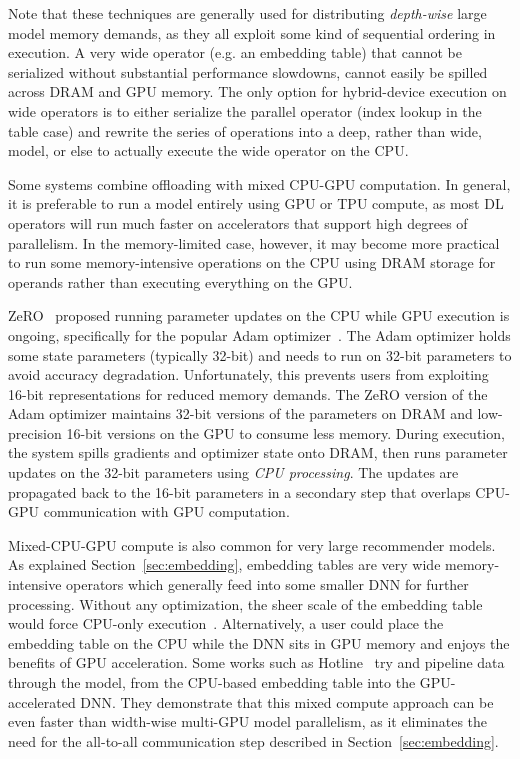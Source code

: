 Note that these techniques are generally used for distributing \textit{depth-wise} large model memory demands, as they all exploit some kind of sequential ordering in execution. A very wide operator (e.g. an embedding table) that cannot be serialized without substantial performance slowdowns, cannot easily be spilled across DRAM and GPU memory. The only option for hybrid-device execution on wide operators is to either serialize the parallel operator (index lookup in the table case) and rewrite the series of operations into a deep, rather than wide, model, or else to actually execute the wide operator on the CPU. 

Some systems combine offloading with mixed CPU-GPU computation. In general, it is preferable to run a model entirely using GPU or TPU compute, as most DL operators will run much faster on accelerators that support high degrees of parallelism. In the memory-limited case, however, it may become more practical to run some memory-intensive operations on the CPU using DRAM storage for operands rather than executing everything on the GPU.

ZeRO~\cite{zerooffload2021} proposed running parameter updates on the CPU while GPU execution is ongoing, specifically for the popular Adam optimizer~\cite{adam2014}. The Adam optimizer holds some state parameters (typically 32-bit) and needs to run on 32-bit parameters to avoid accuracy degradation. Unfortunately, this prevents users from exploiting 16-bit representations for reduced memory demands. The ZeRO version of the Adam optimizer maintains 32-bit versions of the parameters on DRAM and low-precision 16-bit versions on the GPU to consume less memory. During execution, the system spills gradients and optimizer state onto DRAM, then runs parameter updates on the 32-bit parameters using \textit{CPU processing}. The updates are propagated back to the 16-bit parameters in a secondary step that overlaps CPU-GPU communication with GPU computation. 

Mixed-CPU-GPU compute is also common for very large recommender models. As explained Section~\ref{sec:embedding}, embedding tables are very wide memory-intensive operators which generally feed into some smaller DNN for further processing. Without any optimization, the sheer scale of the embedding table would force CPU-only execution~\cite{dlrmscale2020}. Alternatively, a user could place the embedding table on the CPU while the DNN sits in GPU memory and enjoys the benefits of GPU acceleration. Some works such as Hotline~\cite{hotline2020} try and pipeline data through the model, from the CPU-based embedding table into the GPU-accelerated DNN. They demonstrate that this mixed compute approach can be even faster than width-wise multi-GPU model parallelism, as it eliminates the need for the all-to-all communication step described in Section~\ref{sec:embedding}.

